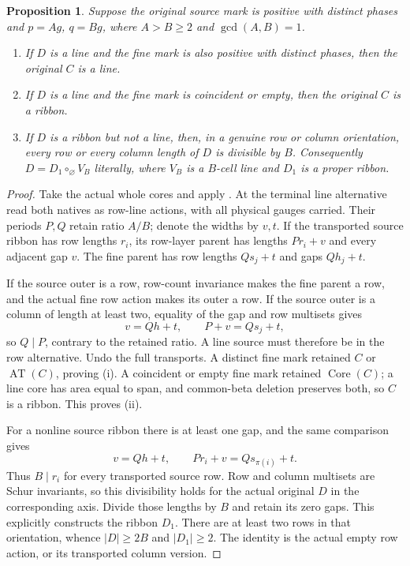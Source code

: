 \documentclass[11pt,a4paper]{amsart}
\numberwithin{equation}{section}
\theoremstyle{plain}
\newtheorem{proposition}[theorem]{Proposition}
\theoremstyle{definition}
\newcommand{\AT}{\operatorname{AT}}
\newcommand{\Core}{\operatorname{Core}}
\begin{document}
\begin{proposition}\label{prop:line-entry}
Suppose the original source mark is positive with distinct phases and
\(p=Ag\), \(q=Bg\), where \(A>B\ge2\) and \(\gcd(A,B)=1\).
\begin{enumerate}
\item If \(D\) is a line and the fine mark is also positive with distinct
phases, then the original \(C\) is a line.
\item If \(D\) is a line and the fine mark is coincident or empty, then the
original \(C\) is a ribbon.
\item If \(D\) is a ribbon but not a line, then, in a genuine row or column
orientation, every row or every column length of \(D\) is divisible by \(B\).
Consequently \(D=D_1\circ_{\varnothing}V_B\) literally, where \(V_B\) is a
\(B\)-cell line and \(D_1\) is a proper ribbon.
\end{enumerate}
\end{proposition}
\begin{proof}
Take the actual whole cores and apply .  At the
terminal line alternative read both natives as row-line actions, with all
physical gauges carried.  Their periods \(P,Q\) retain ratio \(A/B\); denote
the widths by \(v,t\).  If the transported source ribbon has row lengths
\(r_i\), its row-layer parent has lengths \(Pr_i+v\) and every adjacent gap
\(v\).  The fine parent has row lengths \(Qs_j+t\) and gaps \(Qh_j+t\).

If the source outer is a row, row-count invariance makes the fine parent a
row, and the actual fine row action makes its outer a row.  If the source
outer is a column of length at least two, equality of the gap and row
multisets gives
\[
 v=Qh+t,\qquad P+v=Qs_j+t,
\]
so \(Q\mid P\), contrary to the retained ratio.  A line source must therefore
be in the row alternative.  Undo the full transports.  A distinct fine
mark retained \(C\) or \(\AT(C)\), proving (i).  A coincident or empty fine mark
retained \(\Core(C)\); a line core has area equal to span, and common-beta
deletion preserves both, so \(C\) is a ribbon.  This proves (ii).

For a nonline source ribbon there is at least one gap, and the same
comparison gives
\[
 v=Qh+t,\qquad Pr_i+v=Qs_{\pi(i)}+t.
\]
Thus \(B\mid r_i\) for every transported source row.  Row and column
multisets are Schur invariants, so this divisibility holds for the actual
original \(D\) in the corresponding axis.  Divide those lengths by \(B\) and
retain its zero gaps.  This explicitly constructs the ribbon \(D_1\).
There are at least two rows in that orientation, whence
\(|D|\ge2B\) and \(|D_1|\ge2\).  The identity is the actual empty row action,
or its transported column version.
\end{proof}
\end{document}
